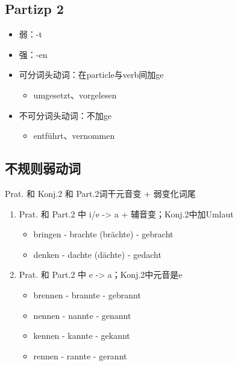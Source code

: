 \documentclass[UTF8]{report}
\begin{document}
\subsection{Partizp 2}
\begin{itemize}
    \item 弱：-t
    \item 强：-en
    \item 可分词头动词：在particle与verb间加ge
    \begin{itemize}
        \item umgesetzt、vorgelesen
    \end{itemize}
    \item 不可分词头动词：不加ge
    \begin{itemize}
        \item entführt、vernommen
    \end{itemize}
\end{itemize}

\subsection{不规则弱动词}
Prat. 和 Konj.2 和 Part.2词干元音变 + 弱变化词尾
\begin{enumerate}
    \item Prat. 和 Part.2 中 i/e -> a + 辅音变；Konj.2中加Umlaut
    \begin{itemize}
        \item bringen - brachte (brächte) - gebracht
		\item denken - dachte (dächte) - gedacht
    \end{itemize}
    \item Prat. 和 Part.2 中 e -> a；Konj.2中元音是e
    \begin{itemize}
        \item brennen - brannte - gebrannt
        \item nennen - nannte - genannt
        \item kennen - kannte - gekannt
        \item rennen - rannte - gerannt
    \end{itemize}
\end{enumerate}
\end{document}
